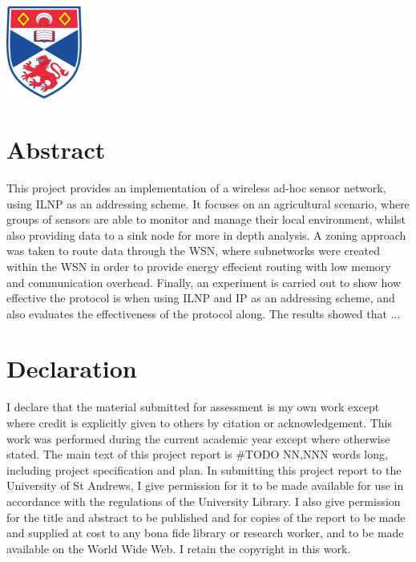 \documentclass[12pt]{article}
\begin{document}
\begin{titlepage}
\includegraphics[width = 2.5cm]{images/standrewslogo.png}
 

\vfill %

\end{titlepage}


\part*{Abstract}

This project provides an implementation of a wireless ad-hoc sensor network, using ILNP as an addressing scheme. It focuses on an agricultural scenario, where groups of sensors are able to monitor and manage their local environment, whilst also providing data to a sink node for more in depth analysis. A zoning approach was taken to route data through the WSN, where subnetworks were created within the WSN in order to provide energy effecient routing with low memory and communication overhead. Finally, an experiment is carried out to show how effective the protocol is when using ILNP and IP as an addressing scheme, and also evaluates the effectiveness of the protocol along. The results showed that ...

\part*{Declaration}
I declare that the material submitted for
assessment is my own work except where credit is
explicitly given to others by citation or
acknowledgement. This work was performed during
the current academic year except where otherwise
stated.
The main text of this project report is \#TODO NN,NNN
words long, including project specification and plan.
In submitting this project report to the University of
St Andrews, I give permission for it to be made
available for use in accordance with the regulations of
the University Library. I also give permission for
the title and abstract to be published and for copies of
the report to be made and supplied at cost to any bona
fide library or research worker, and to be made
available on the World Wide Web. I retain the
copyright in this work.
\end{document}
